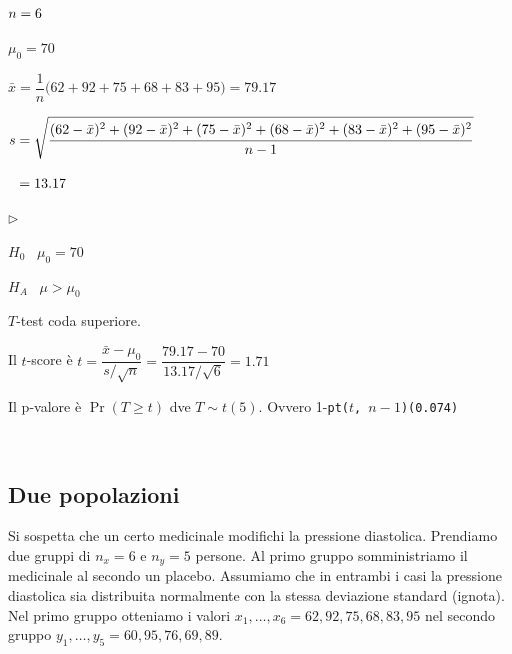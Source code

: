 \documentclass[11pt,openany]{book}
\newcommand{\mylabel}[1]{{\footnotesize\textsf{#1}}\hfill}
\renewenvironment{itemize}
  {\begin{list}{$\triangleright$}{%
   \setlength{\parskip}{0mm}
   \setlength{\topsep}{.2\baselineskip}
   \setlength{\rightmargin}{0mm}
   \setlength{\listparindent}{0mm}
   \setlength{\itemindent}{0mm}
   \setlength{\labelwidth}{3ex}
   \setlength{\itemsep}{.4\baselineskip}
   \setlength{\parsep}{0mm}
   \setlength{\partopsep}{0mm}
   \setlength{\labelsep}{1ex}
   \setlength{\leftmargin}{\labelwidth+\labelsep}
   \let\makelabel\mylabel}}{%
   \end{list}\vspace*{-1.3mm}}
\begin{document}
$\strut n=6$

$\mu_0=70$

$\bar x =\dfrac1n\big(62+92+75+68+83+95\big) =79.17$

$s = \sqrt{\dfrac{\strut(62-\bar x)^2+(92-\bar x)^2+(75-\bar x)^2+(68-\bar x)^2+(83-\bar x)^2+(95-\bar x)^2}{n-1}}$

$\strut\phantom{s} = 13.17$

\begin{itemize}
\item[1.] $H_0$ \ $\mu_0 = 70$

\item[2.] $H_A$ \ $\mu>\mu_0$

\item[3.] $T$-test coda superiore. 

\item[4.] Il $t$-score è 
$t = \dfrac{\bar x - \mu_0}{s/\sqrt{n}}=\dfrac{79.17-70}{13.17/\sqrt{6}} = 1.71$

\item[5.] Il p-valore è $\Pr(T\ge t)$ dve $T\sim t(5)$. Ovvero 1-{\tt pt($t$, $n-1$)}\hfill{\tt (0.074)}
\end{itemize}




\clearpage\
\subsection{Due popolazioni}
Si sospetta che un certo medicinale modifichi la pressione diastolica.  Prendiamo due gruppi di $n_x=6$ e $n_y=5$ persone. Al primo gruppo somministriamo il medicinale al secondo un placebo. Assumiamo che in entrambi i casi la pressione diastolica sia distribuita normalmente con la stessa deviazione standard (ignota). Nel primo gruppo otteniamo i valori $x_1,\dots,x_6=62,92,75,68,83,95$ nel secondo gruppo $y_1,\dots,y_5=60,95,76,69,89$.
\end{document}
